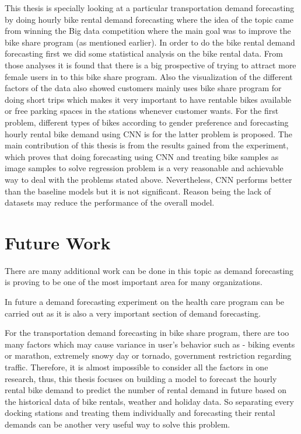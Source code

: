 This thesis is specially looking at a particular transportation demand forecasting by doing hourly bike rental demand forecasting where the idea of the topic came from winning the Big data competition where the main goal was to improve the bike share program (as mentioned earlier). In order to do the bike rental demand forecasting first we did some statistical analysis on the bike rental data. From those analyses it is found that there is a big prospective of trying to attract more female users in to this bike share program. Also the visualization of the different factors of the data also showed customers mainly uses bike share program for doing short trips which makes it very important to have rentable bikes available or free parking spaces in the stations whenever customer wants. For the first problem, different types of bikes according to gender preference and forecasting hourly rental bike demand using CNN is for the latter problem is proposed. The main contribution of this thesis is from the results gained from the experiment, which proves that doing forecasting using CNN and treating bike samples as image samples to solve regression problem is a very reasonable and achievable way to deal with the problems stated above. Nevertheless, CNN performs better than the baseline models but it is not significant. Reason being the lack of datasets may reduce the performance of the overall model. 

\section{Future Work}
\label{future}

There are many additional work can be done in this topic as demand forecasting is proving to be one of the most important area for many organizations. 

In future a demand forecasting experiment on the health care program can be carried out as it is also a very important section of demand forecasting. 

For the transportation demand forecasting in bike share program, there are too many factors which may cause variance in user's behavior such as - biking events or marathon, extremely snowy day or tornado, government restriction regarding traffic. Therefore, it is almost impossible to consider all the factors in one research, thus, this thesis focuses on building a model to forecast the hourly rental bike demand to predict the number of rental demand in future based on the historical data of bike rentals, weather and holiday data. So separating every docking stations and treating them individually and forecasting their rental demands can be another very useful way to solve this problem. 

